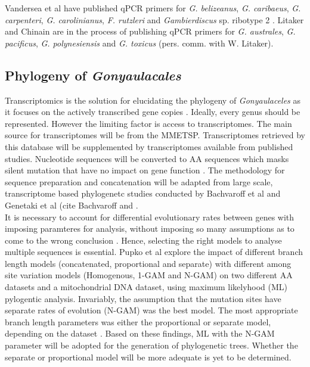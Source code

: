 \documentclass[12pt]{article}
\begin{document}
Vandersea et al have published qPCR primers for \emph{G. belizeanus}, \emph{G. caribaeus}, \emph{G. carpenteri}, \emph{G. carolinianus}, \emph{F. rutzleri} and \emph{Gambierdiscus} sp. ribotype 2 \cite{vandersea2012development}. Litaker and Chinain are in the process of publishing qPCR primers for \emph{G. australes}, \emph{G. pacificus}, \emph{G. polynesiensis} and \emph{G. toxicus} (pers. comm. with W. Litaker).

\subsection{Phylogeny of \emph{Gonyaulacales}}
Transcriptomics is the solution for elucidating the phylogeny of \emph{Gonyaulaceles} as it focuses on the actively transcribed gene copies \cite{murray2012transcriptomics}. Ideally, every genus should be represented. However the limiting factor is access to transcriptomes. The main source for transcriptomes will be from the MMETSP. Transcriptomes retrieved by this database will be supplemented by transcriptomes available from published studies. Nucleotide sequences will be converted to AA sequences which masks silent mutation that have no impact on gene function \cite{bachvaroff2014dinoflagellate}. The methodology for sequence preparation and concatenation will be adapted from large scale, transcriptome based phylogenetc studies conducted by Bachvaroff et al and Genetaki et al (cite Bachvaroff and \cite{gentekaki2014large,bachvaroff2014dinoflagellate}.\\
It is necessary to account for differential evolutionary rates between genes with imposing paramteres for analysis, without imposing so many assumptions as to come to the wrong conclusion \cite{pupko2002combining}. Hence, selecting the right models to analyse multiple sequences is essential. Pupko et al explore the impact of different branch length models (concatenated, proportional and separate) with different among site variation models (Homogenous, 1-GAM and N-GAM) on two different AA datasets and a mitochondrial DNA dataset, using maximum likelyhood (ML) pylogentic analysis. Invariably, the assumption that the mutation sites have separate rates of evolution (N-GAM) was the best model. The most appropriate branch length parameters was either the proportional or separate model, depending on the dataset \cite{pupko2002combining}. Based on these findings, ML with the N-GAM parameter will be adopted for the generation of phylogenetic trees. Whether the separate or proportional model will be more adequate is yet to be determined.
\end{document}
